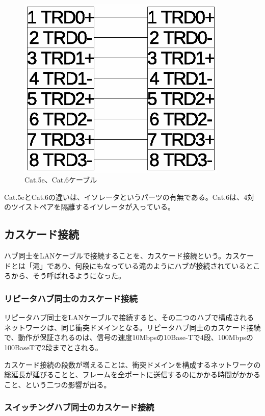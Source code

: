 \begin{figure}[htbp]
	\includegraphics[width=10cm,clip]{draw/cat5e.eps}
	\caption{Cat.5e、Cat.6ケーブル}
	\label{fig:cat5e}
\end{figure}

Cat.5eとCat.6の違いは、イソレータというパーツの有無である。Cat.6は、4対のツイストペアを隔離するイソレータが入っている。

\subsection{カスケード接続}

ハブ同士をLANケーブルで接続することを、カスケード接続という。カスケードとは「滝」であり、何段にもなっている滝のようにハブが接続されているところから、そう呼ばれるようになった。

\subsubsection{リピータハブ同士のカスケード接続}

リピータハブ同士をLANケーブルで接続すると、その二つのハブで構成されるネットワークは、同じ衝突ドメインとなる。リピータハブ同士のカスケード接続で、動作が保証されるのは、信号の速度10Mbpsの10Base-Tで4段、100Mbpsの100BaseTで2段までとされる。

カスケード接続の段数が増えることは、衝突ドメインを構成するネットワークの総延長が延びることと、フレームを全ポートに送信するのにかかる時間がかかること、という二つの影響が出る。

\subsubsection{スイッチングハブ同士のカスケード接続}

